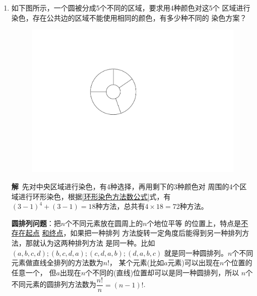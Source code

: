 \begin{enumerate}[label={【\textbf{例\thechapter.\arabic*}】},
 leftmargin=\inteval{\myenumleftmargin}pt,
 itemsep=\inteval{\myenumitempsep}pt,
 itemindent=\inteval{\myenumitemindent}pt]
\item 如下图所示，一个圆被分成5个不同的区域，要求用4种颜色对这5个
区域进行染色，存在公共边的区域不能使用相同的颜色，有多少种不同的
染色方案？
\begin{figure}[H]
    \centering
    \includegraphics[width=0.25\linewidth]{PDF_Picture/环形染色-4个扇形}
\end{figure}
\textbf{解}\ 先对中央区域进行染色，有4种选择，再用剩下的3种颜色对
周围的4个区域进行环形染色，根据\eqref{环形染色方法数公式}式，有
$ (3-1)^4+(3-1)=18 $种方法，总共有$ 4\times 18=72 $种方法。
\bigskip

\textbf{圆排列问题}：把$n$个不同元素放在圆周上的$n$个地位平等
的位置上，特点是\underline{不存在起点}
\underline{和终点}，如果把一种排列
方法旋转一定角度后能得到另一种排列方法，那就认为这两种排列方法
是同一种。比如$(a,b,c,d); (b,c,d,a); (c,d,a,b); (d,a,b,c)$
就是同一种圆排列。$n$个不同元素做直线全排列的方法数为$n!$，
某个元素(比如$a$元素)可以出现在$n$个位置的任意一个，
但$a$出现在$n$个不同的(直线)位置却可以是同一种圆排列，所以
$n$个不同元素的圆排列方法数为$\dfrac{n!}{n}=(n-1)!$.


\end{enumerate}

